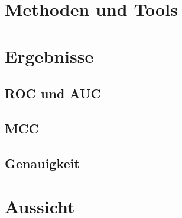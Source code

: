 \documentclass[12pt,a4paper]{article}
\begin{document}
\section{Methoden und Tools}

\section{Ergebnisse}

\subsection{ROC und AUC}

\subsection{MCC}

\subsection{Genauigkeit}

\section{Aussicht}




\end{document}
